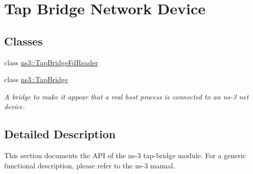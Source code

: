 \hypertarget{group__tap-bridge}{}\section{Tap Bridge Network Device}
\label{group__tap-bridge}
\subsection*{Classes}
\begin{DoxyCompactItemize}
\item 
class \hyperlink{classns3_1_1TapBridgeFdReader}{ns3\+::\+Tap\+Bridge\+Fd\+Reader}
\item 
class \hyperlink{classns3_1_1TapBridge}{ns3\+::\+Tap\+Bridge}
\begin{DoxyCompactList}\small\item\em A bridge to make it appear that a real host process is connected to an ns-\/3 net device. \end{DoxyCompactList}\end{DoxyCompactItemize}


\subsection{Detailed Description}
This section documents the A\+PI of the ns-\/3 tap-\/bridge module. For a generic functional description, please refer to the ns-\/3 manual. 